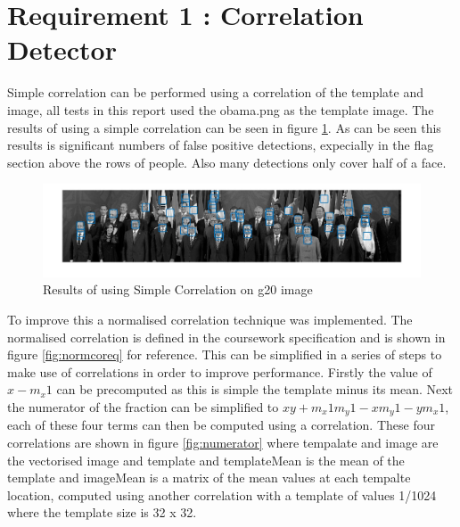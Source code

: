 \documentclass{article}
\begin{document}

\section{Requirement 1 : Correlation Detector}

Simple correlation can be performed using a correlation of the template and image,
all tests in this report used the obama.png as the template image. The results of
using a simple correlation can be seen in figure \ref{fig:simplecor}. As can be
seen this results is significant numbers of false positive detections, expecially
in the flag section above the rows of people. Also many detections only cover half
of a face.\\

\begin{figure}[H]
  \includegraphics[width=\linewidth]{simpleCor.jpg}
  \caption{Results of using Simple Correlation on g20 image}
  \label{fig:simplecor}
\end{figure}

To improve this a normalised correlation technique was implemented. The normalised correlation
is defined in the coursework specification and is shown in figure \ref{fig:normcoreq} for reference.
This can be simplified in a series of steps to make use of correlations in order to
improve performance. Firstly the value of $x - m_x1$ can be precomputed as this is
simple the template minus its mean. Next the numerator of the fraction can be simplified
to $xy + m_x1m_y1 - xm_y1 - ym_x1$, each of these four terms can then be computed
using a correlation. These four correlations are shown in figure \ref{fig:numerator}
where tempalate and image are the vectorised image and template and templateMean is
the mean of the template and imageMean is a matrix of the mean values at each tempalte
location, computed using another correlation with a template of values 1/1024 where
the template size is 32 x 32.\\
\end{document}
